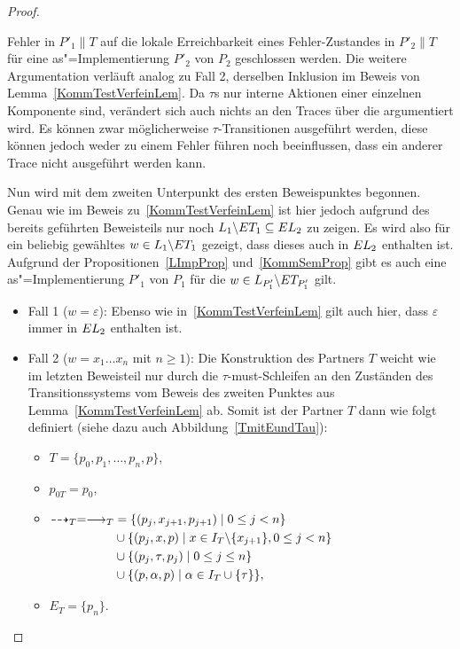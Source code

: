 \begin{proof}
\begin{itemize}
      Fehler in $P'_1\|T$ auf die lokale Erreichbarkeit eines Fehler-Zustandes
      in $P'_2\|T$ für eine as"=Implementierung $P'_2$ von $P_2$ geschlossen
      werden. Die weitere Argumentation verläuft analog zu Fall 2, derselben
      Inklusion im Beweis von Lemma~\ref{KommTestVerfeinLem}. Da $\tau$s nur
      interne Aktionen einer einzelnen Komponente sind, verändert sich auch
      nichts an den Traces über die argumentiert wird. Es können zwar
      möglicherweise $\tau$-Transitionen ausgeführt werden, diese können jedoch
      weder zu einem Fehler führen noch beeinflussen, dass ein anderer Trace
      nicht ausgeführt werden kann.
  \end{itemize}

  Nun wird mit dem zweiten Unterpunkt des ersten Beweispunktes begonnen. Genau
  wie im Beweis zu~\ref{KommTestVerfeinLem} ist hier jedoch aufgrund des
  bereits geführten Beweisteils nur noch $L_1\backslash\ET _1\subseteq\EL _2$
  zu zeigen. Es wird also für ein beliebig gewähltes $w\in L_1\backslash\ET _1$
  gezeigt, dass dieses auch in $\EL _2$ enthalten ist. Aufgrund der
  Propositionen~\ref{LImpProp} und~\ref{KommSemProp} gibt es auch eine
  as"=Implementierung $P'_1$ von $P_1$ für die $w\in L_{P'_1}\backslash \ET
  _{P'_1}$ gilt.
  \begin{itemize}
    \item Fall 1 ($w=\varepsilon$): Ebenso wie in~\ref{KommTestVerfeinLem} gilt
      auch hier, dass $\varepsilon$ immer in $\EL _2$ enthalten ist.
    \item Fall 2 ($w=x_1\dots x_n$ mit $n\geq 1$): Die Konstruktion des
      Partners $T$ weicht wie im letzten Beweisteil nur durch die
      $\tau$-must-Schleifen an den Zuständen des Transitionssystems vom Beweis
      des zweiten Punktes aus Lemma~\ref{KommTestVerfeinLem} ab. Somit ist der
      Partner $T$ dann wie folgt definiert (siehe dazu auch
      Abbildung~\ref{TmitEundTau}):
      \begin{itemize}
        \item $T=\{p_0,p_1,\dots ,p_n,p\}$,
        \item $p_{0T}=p_0$,
        \item $\begin{aligned}[t]
            \may _T = \must _T&=\{(p_j,x_{j+1},p_{j+1})\mid 0\leq j< n\}\\
            &\cup\{(p_j,x,p)\mid x\in I_T\backslash\{x_{j+1}\},0\leq j < n\}\\
            &\cup\{(p_j,\tau ,p_j)\mid 0\leq j\leq n\}\\
            &\cup\{(p,\alpha ,p)\mid \alpha\in I_T\cup \{\tau\}\},
              \end{aligned}$
        \item $E_T=\{p_n\}$.
      \end{itemize}
      \begin{figure} [h!tbp]
      \begin{center}
        \begin{tikzpicture}[->, >=latex',auto,node distance =3cm, semithick]


\end{tikzpicture}
\end{center}
\end{figure}
\end{itemize}
\end{proof}
